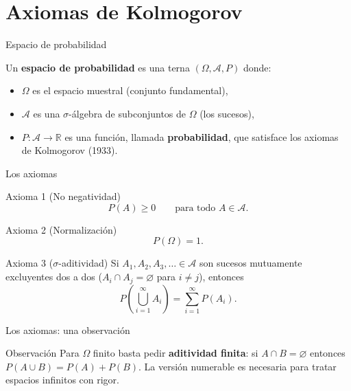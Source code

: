 \documentclass[aspectratio=169,11pt]{beamer}
\begin{document}
\section{Axiomas de Kolmogorov}

\begin{frame}{Espacio de probabilidad}
\begin{definition}
Un \textbf{espacio de probabilidad} es una terna $(\Omega, \mathcal{A}, P)$ donde:
\begin{itemize}
\item $\Omega$ es el espacio muestral (conjunto fundamental),
\item $\mathcal{A}$ es una $\sigma$-álgebra de subconjuntos de $\Omega$ (los sucesos),
\item $P: \mathcal{A} \to \mathbb{R}$ es una función, llamada \textbf{probabilidad}, que satisface los axiomas de Kolmogorov (1933).
\end{itemize}
\end{definition}
\end{frame}

\begin{frame}{Los axiomas}
\begin{block}{Axioma 1 (No negatividad)}
\[
P(A) \geq 0 \qquad \text{para todo } A \in \mathcal{A}.
\]
\end{block}
\begin{block}{Axioma 2 (Normalización)}
\[
P(\Omega) = 1.
\]
\end{block}
\begin{block}{Axioma 3 ($\sigma$-aditividad)}
Si $A_1, A_2, A_3, \dots \in \mathcal{A}$ son sucesos mutuamente excluyentes dos a dos ($A_i \cap A_j = \varnothing$ para $i \neq j$), entonces
\[
P\left(\bigcup_{i=1}^{\infty} A_i\right) = \sum_{i=1}^{\infty} P(A_i).
\]
\end{block}
\end{frame}

\begin{frame}{Los axiomas: una observación}
\begin{alertblock}{Observación}
Para $\Omega$ finito basta pedir \textbf{aditividad finita}: si $A\cap B=\varnothing$ entonces $P(A\cup B)=P(A)+P(B)$. La versión numerable es necesaria para tratar espacios infinitos con rigor.
\end{alertblock}
\end{frame}
\end{document}
